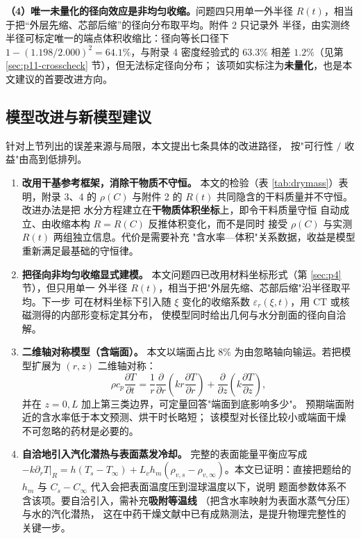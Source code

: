 \documentclass[12pt,a4paper,fontset=none]{ctexart}
\begin{document}
\textbf{（4）唯一未量化的径向效应是非均匀收缩。}问题四只用单一外半径
$R(t)$，相当于把“外层先缩、芯部后缩”的径向分布取平均。附件 2 只记录外
半径，由实测终半径可标定唯一的端点体积收缩比：径向等长口径下
$1-(1.198/2.000)^2=64.1\%$，与附录 4 密度经验式的 $63.3\%$ 相差
$1.2\%$（见第 \ref{sec:p11-crosscheck} 节），但无法标定径向分布；
该项如实标注为\textbf{未量化}，也是本文建议的首要改进方向。

\subsection{模型改进与新模型建议}
\label{sec:improve}

针对上节列出的误差来源与局限，本文提出七条具体的改进路径，
按"可行性 $/$ 收益"由高到低排列。

\begin{enumerate}
  \item \textbf{改用干基参考框架，消除干物质不守恒。}
        本文的检验（表 \ref{tab:drymass}）表明，附录 3、4 的 $\rho(C)$
        与附件 2 的 $R(t)$ 共同隐含的干料质量并不守恒。改进办法是把
        水分方程建立在\textbf{干物质体积坐标}上，即令干料质量守恒
        自动成立、由收缩本构 $R=R(C)$ 反推体积变化，而不是同时
        接受 $\rho(C)$ 与实测 $R(t)$ 两组独立信息。代价是需要补充
        "含水率—体积"关系数据，收益是模型重新满足最基础的守恒律。

  \item \textbf{把径向非均匀收缩显式建模。}
        本文问题四已改用材料坐标形式（第 \ref{sec:p4} 节），但只用单一
        外半径 $R(t)$，相当于把"外层先缩、芯部后缩"沿半径取平均。下一步
        可在材料坐标下引入随 $\xi$ 变化的收缩系数
        $\varepsilon_r(\xi,t)$，用 CT 或核磁测得的内部形变标定其分布，
        使模型同时给出几何与水分剖面的径向自洽解。

  \item \textbf{二维轴对称模型（含端面）。}
        本文以端面占比 $8\%$ 为由忽略轴向输运。若把模型扩展为
        $(r,z)$ 二维轴对称：
        \[
          \rho c_p\frac{\partial T}{\partial t}
          =\frac{1}{r}\frac{\partial}{\partial r}
            \left(kr\frac{\partial T}{\partial r}\right)
          +\frac{\partial}{\partial z}
            \left(k\frac{\partial T}{\partial z}\right),
        \]
        并在 $z=0,L$ 加上第三类边界，可定量回答"端面到底影响多少"。
        预期端面附近的含水率低于本文预测、烘干时长略短；
        该模型对长径比较小或端面干燥不可忽略的药材是必要的。

  \item \textbf{自洽地引入汽化潜热与表面蒸发冷却。}
        完整的表面能量平衡应写成
        $-k\partial_rT|_R=h(T_s-T_\infty)+L_vh_m(\rho_{v,s}
        -\rho_{v,\infty})$。本文已证明：直接把题给的 $h_m$ 与
        $C_s-C_\infty$ 代入会把表面温度压到湿球温度以下，说明
        题面参数体系不含该项。要自洽引入，需补充\textbf{吸附等温线}
        （把含水率映射为表面水蒸气分压）与水的汽化潜热，
        这在中药干燥文献中已有成熟测法，是提升物理完整性的关键一步。


\end{enumerate}
\end{document}

